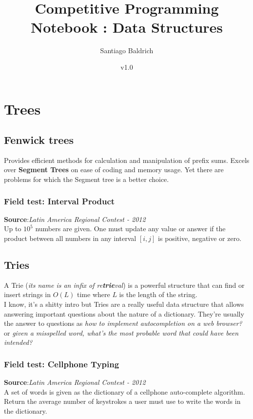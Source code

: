 \documentclass[11pt, oneside]{article}   	%
\title{Competitive Programming Notebook : Data Structures}
\author{Santiago Baldrich}
\date{v1.0}
\begin{document}
\tableofcontents
\newpage


\section{Trees}

\subsection{Fenwick trees}
Provides efficient methods for calculation and manipulation of prefix sums. Excels over \textbf{Segment Trees} on ease of coding and memory usage. Yet there are problems for which the Segment tree is a better choice.


\subsubsection{Field test: Interval Product }
\textbf{Source}:\textit{Latin America Regional Contest - 2012}\\
Up to $10^5$ numbers are given. One must update any value or answer if the product between all numbers in any interval $[i,j]$ is positive, negative or zero.

\label{fenwick:ex}


\subsection{Tries}
A Trie (\textit{its name is an infix of re\textbf{trie}val}) is a powerful structure that can find or insert strings in $O(L)$ time where $L$ is the length of the string.\\
 I know, it's a shitty intro but Tries are a really useful data structure that allows answering important questions about the nature of a dictionary. They're usually the answer to questions as \textit{how to implement autocompletion on a web browser? } or \textit{given a misspelled word, what's the most probable word that could have been intended?}
 

\subsubsection{Field test: Cellphone Typing }\label{trie:ex}
\textbf{Source}:\textit{Latin America Regional Contest - 2012}\\
A set of words is given as the dictionary of a cellphone auto-complete algorithm. Return the average number of keystrokes a user must use to write the words in the dictionary.\\
\end{document}
